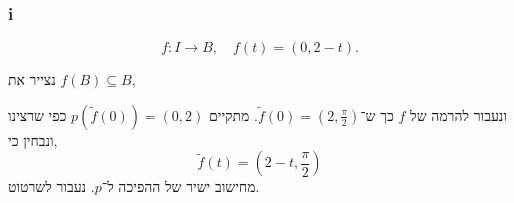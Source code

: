 \subsubsection{i}
\[
	f : I \to B,
	\quad
	f(t) = (0, 2 - t)
.\]
\begin{solution}
	נצייר את $f(B) \subseteq B$,
	\begin{otherlanguage}{english}
		\begin{center}
		\end{center}
	\end{otherlanguage}
	ונעבור להרמה של $f$ כך ש־$\tilde{f}(0) = (2, \frac{\pi}{2})$.
	מתקיים $p(\tilde{f}(0)) = (0, 2)$ כפי שרצינו ונבחין כי,
	\[
		\tilde{f}(t)
		= (2 - t, \frac{\pi}{2})
	\]
	מחישוב ישיר של ההפיכה ל־$p$.
	נעבור לשרטוט.
	\begin{otherlanguage}{english}
		\begin{center}
		\end{center}
	\end{otherlanguage}
\end{solution}


